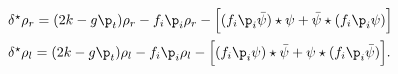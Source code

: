 \begin{equation}
     \begin{array}{ll}
\delta^{\star}\rho_{r}
=
(2k-g\p_{t})\rho_{r}-f_{i}\p_{i}\rho_{r}
-\Big[(f_{i}\p_{i}\bar{\psi})\star\psi
+\bar{\psi}\star (f_{i}\p_{i}\psi)\Big]
\\[8pt]
\delta^{\star}\rho_{l}=
(2k-g\p_{t})\rho_{l}-f_{i}\p_{i}\rho_{l}
-\Big[(f_{i}\p_{i}\psi)\star\bar{\psi}
+\psi\star (f_{i}\p_{i}\bar{\psi})\Big].
\end{array}
\end{equation}

